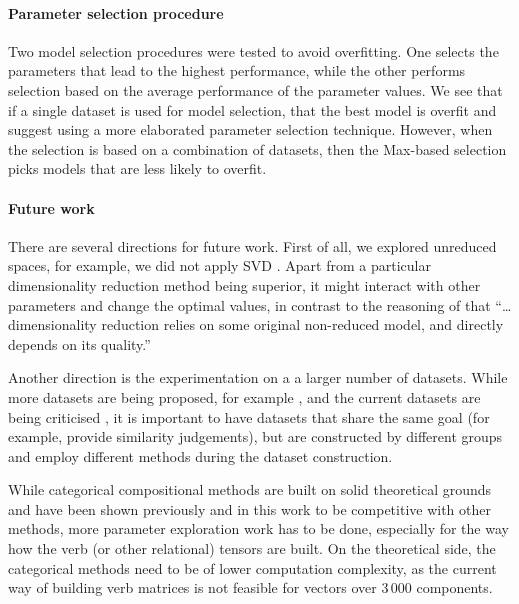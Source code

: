 \documentclass[11pt,a4paper,english,oneside]{book}
\newcommand\newcite\citet
\renewcommand\cite\citep
\begin{document}
\paragraph{Parameter selection procedure}

Two model selection procedures were tested to avoid overfitting. One selects the parameters that lead to the highest performance, while the other performs selection based on the average performance of the parameter values. We see that if a single dataset is used for model selection, that the best model is overfit and suggest using a more elaborated parameter selection technique. However, when the selection is based on a combination of datasets, then the Max-based selection picks models that are less likely to overfit.

\paragraph{Future work}

There are several directions for future work. First of all, we explored unreduced spaces, for example, we did not apply SVD \cite{BullinariaLevy2012}. Apart from a particular dimensionality reduction method being superior, it might interact with other parameters \cite{lapesa2014large} and change the optimal values, in contrast to the reasoning of \newcite{kiela-clark:2014:CVSC} that ``\ldots dimensionality reduction relies on some original non-reduced model, and directly depends on its quality.''

Another direction is the experimentation on a a larger number of datasets. While more datasets are being proposed, for example \newcite{2016arXiv160800869G}, and the current datasets are being criticised \cite{RepEval:2016}, it is important to have datasets that share the same goal (for example, provide similarity judgements), but are constructed by different groups and employ different methods during the dataset construction.

While categorical compositional methods are built on solid theoretical grounds \cite{DBLP:journals/corr/abs-1003-4394} and have been shown previously \cite{Grefenstette:2011:ETV:2140490.2140497,kartsadrqpl2014,fried-polajnar-clark:2015:ACL-IJCNLP,kim2015neural,hashimoto-tsuruoka:2016:P16-1} and in this work to be competitive with other methods, more parameter exploration work has to be done, especially for the way how the verb (or other relational) tensors are built. On the theoretical side, the categorical methods need to be of lower computation complexity, as the current way of building verb matrices is not feasible for vectors over 3\,000 components.
\end{document}
